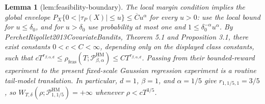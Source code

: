 \documentclass{article}
\newtheorem{lemma}{Lemma}
\begin{document}
\begin{lemma}[lem:feasibility-boundary]\label{lem:feasibility-boundary}
The local margin condition implies the global envelope \(P_X\{0<|\tau_P(X)|\le u\}\le\overline C u^\alpha\) for every \(u>0\): use the local bound for \(u\le\delta_0\), and for \(u>\delta_0\) use probability at most one and \(1\le\delta_0^{-\alpha}u^\alpha\). By PerchetRigollet2013CovariateBandits, Theorem 5.1 and Proposition 3.1, there exist constants \(0<c<C<\infty\), depending only on the displayed class constants, such that \(cT^{r_{\beta,\alpha,d}}\le\rho_{\mathrm{feas}}(T;\mathcal P_{\beta,\alpha}^{\mathrm{HM}})\le CT^{r_{\beta,\alpha,d}}\). Passing from their bounded-reward experiment to the present fixed-scale Gaussian regression experiment is a routine tail-model translation. In particular, \(d=1\), \(\beta=1\), and \(\alpha=1/5\) give \(r_{1,1/5,1}=3/5\), so \(W_{T,\delta}(\rho;\mathcal P_{1,1/5}^{\mathrm{HM}})=+\infty\) whenever \(\rho<cT^{3/5}\).
\end{lemma}
\end{document}
